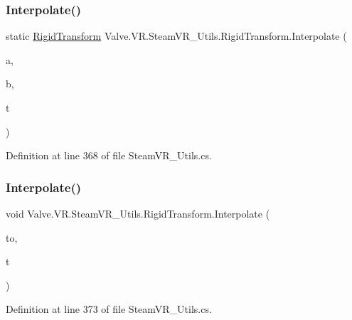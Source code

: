 \subsubsection{\texorpdfstring{Interpolate()}{Interpolate()}\hspace{0.1cm}{\footnotesize\ttfamily [1/2]}}
{\footnotesize\ttfamily static \mbox{\hyperlink{struct_valve_1_1_v_r_1_1_steam_v_r___utils_1_1_rigid_transform}{Rigid\+Transform}} Valve.\+V\+R.\+Steam\+V\+R\+\_\+\+Utils.\+Rigid\+Transform.\+Interpolate (\begin{DoxyParamCaption}\item[{\mbox{\hyperlink{struct_valve_1_1_v_r_1_1_steam_v_r___utils_1_1_rigid_transform}{Rigid\+Transform}}}]{a,  }\item[{\mbox{\hyperlink{struct_valve_1_1_v_r_1_1_steam_v_r___utils_1_1_rigid_transform}{Rigid\+Transform}}}]{b,  }\item[{float}]{t }\end{DoxyParamCaption})\hspace{0.3cm}{\ttfamily [static]}}



Definition at line 368 of file Steam\+V\+R\+\_\+\+Utils.\+cs.

\mbox{\label{struct_valve_1_1_v_r_1_1_steam_v_r___utils_1_1_rigid_transform_ae46951071414d13e25a358d39481f2e1}} 
\subsubsection{\texorpdfstring{Interpolate()}{Interpolate()}\hspace{0.1cm}{\footnotesize\ttfamily [2/2]}}
{\footnotesize\ttfamily void Valve.\+V\+R.\+Steam\+V\+R\+\_\+\+Utils.\+Rigid\+Transform.\+Interpolate (\begin{DoxyParamCaption}\item[{\mbox{\hyperlink{struct_valve_1_1_v_r_1_1_steam_v_r___utils_1_1_rigid_transform}{Rigid\+Transform}}}]{to,  }\item[{float}]{t }\end{DoxyParamCaption})}



Definition at line 373 of file Steam\+V\+R\+\_\+\+Utils.\+cs.

